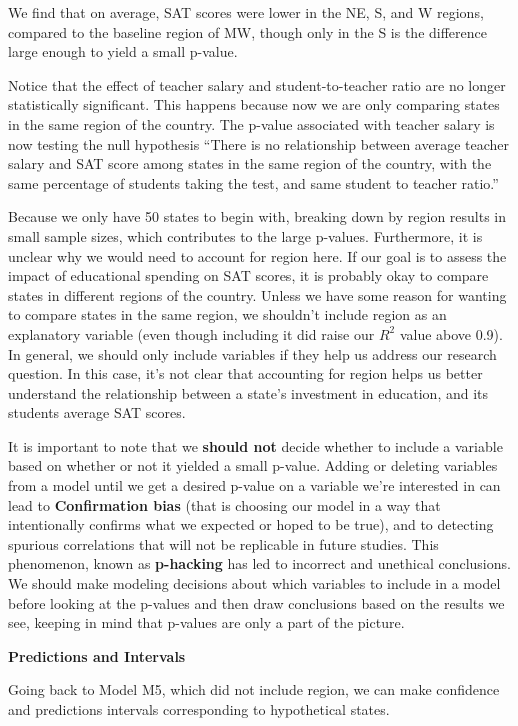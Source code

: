 \documentclass[
  letterpaper,
  DIV=11,
  numbers=noendperiod]{scrreprt}
\begin{document}
We find that on average, SAT scores were lower in the NE, S, and W
regions, compared to the baseline region of MW, though only in the S is
the difference large enough to yield a small p-value.

Notice that the effect of teacher salary and student-to-teacher ratio
are no longer statistically significant. This happens because now we are
only comparing states in the same region of the country. The p-value
associated with teacher salary is now testing the null hypothesis
``There is no relationship between average teacher salary and SAT score
among states in the same region of the country, with the same percentage
of students taking the test, and same student to teacher ratio.''

Because we only have 50 states to begin with, breaking down by region
results in small sample sizes, which contributes to the large p-values.
Furthermore, it is unclear why we would need to account for region here.
If our goal is to assess the impact of educational spending on SAT
scores, it is probably okay to compare states in different regions of
the country. Unless we have some reason for wanting to compare states in
the same region, we shouldn't include region as an explanatory variable
(even though including it did raise our \(R^2\) value above 0.9). In
general, we should only include variables if they help us address our
research question. In this case, it's not clear that accounting for
region helps us better understand the relationship between a state's
investment in education, and its students average SAT scores.

It is important to note that we \textbf{should not} decide whether to
include a variable based on whether or not it yielded a small p-value.
Adding or deleting variables from a model until we get a desired p-value
on a variable we're interested in can lead to \textbf{Confirmation bias}
(that is choosing our model in a way that intentionally confirms what we
expected or hoped to be true), and to detecting spurious correlations
that will not be replicable in future studies. This phenomenon, known as
\textbf{p-hacking} has led to incorrect and unethical conclusions. We
should make modeling decisions about which variables to include in a
model before looking at the p-values and then draw conclusions based on
the results we see, keeping in mind that p-values are only a part of the
picture.

\textbf{Predictions and Intervals}

Going back to Model M5, which did not include region, we can make
confidence and predictions intervals corresponding to hypothetical
states.
\end{document}
